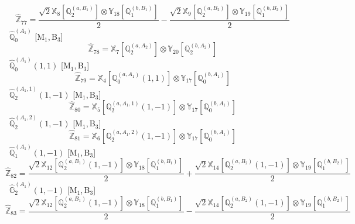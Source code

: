 \documentclass[fleqn,10pt,landscape]{article}
\begin{document}
\begin{itemize}
\begin{dmath*}
\hat{\mathbb{Z}}_{77}=\frac{\sqrt{2} \mathbb{X}_{8}[\mathbb{Q}_{2}^{(a,B_{1})}] \otimes\mathbb{Y}_{18}[\mathbb{Q}_{1}^{(b,B_{1})}]}{2} - \frac{\sqrt{2} \mathbb{X}_{9}[\mathbb{Q}_{2}^{(a,B_{2})}] \otimes\mathbb{Y}_{19}[\mathbb{Q}_{1}^{(b,B_{2})}]}{2}
\end{dmath*}
\vspace{4mm}
\noindent {} $\,\,\,\hat{\mathbb{Q}}_{0}^{(A_{1})}$ [M$_{1}$,\,B$_{3}$]
\begin{dmath*}
\hat{\mathbb{Z}}_{78}=\mathbb{X}_{7}[\mathbb{Q}_{2}^{(a,A_{2})}] \otimes\mathbb{Y}_{20}[\mathbb{Q}_{2}^{(b,A_{2})}]
\end{dmath*}
\vspace{4mm}
\noindent {} $\,\,\,\hat{\mathbb{Q}}_{0}^{(A_{1})}(1,1)$ [M$_{1}$,\,B$_{3}$]
\begin{dmath*}
\hat{\mathbb{Z}}_{79}=\mathbb{X}_{4}[\mathbb{Q}_{0}^{(a,A_{1})}(1,1)] \otimes\mathbb{Y}_{17}[\mathbb{Q}_{0}^{(b,A_{1})}]
\end{dmath*}
\vspace{4mm}
\noindent {} $\,\,\,\hat{\mathbb{Q}}_{2}^{(A_{1},1)}(1,-1)$ [M$_{1}$,\,B$_{3}$]
\begin{dmath*}
\hat{\mathbb{Z}}_{80}=\mathbb{X}_{5}[\mathbb{Q}_{2}^{(a,A_{1},1)}(1,-1)] \otimes\mathbb{Y}_{17}[\mathbb{Q}_{0}^{(b,A_{1})}]
\end{dmath*}
\vspace{4mm}
\noindent {} $\,\,\,\hat{\mathbb{Q}}_{2}^{(A_{1},2)}(1,-1)$ [M$_{1}$,\,B$_{3}$]
\begin{dmath*}
\hat{\mathbb{Z}}_{81}=\mathbb{X}_{6}[\mathbb{Q}_{2}^{(a,A_{1},2)}(1,-1)] \otimes\mathbb{Y}_{17}[\mathbb{Q}_{0}^{(b,A_{1})}]
\end{dmath*}
\vspace{4mm}
\noindent {} $\,\,\,\hat{\mathbb{Q}}_{1}^{(A_{1})}(1,-1)$ [M$_{1}$,\,B$_{3}$]
\begin{dmath*}
\hat{\mathbb{Z}}_{82}=\frac{\sqrt{2} \mathbb{X}_{12}[\mathbb{Q}_{2}^{(a,B_{1})}(1,-1)] \otimes\mathbb{Y}_{18}[\mathbb{Q}_{1}^{(b,B_{1})}]}{2} + \frac{\sqrt{2} \mathbb{X}_{14}[\mathbb{Q}_{2}^{(a,B_{2})}(1,-1)] \otimes\mathbb{Y}_{19}[\mathbb{Q}_{1}^{(b,B_{2})}]}{2}
\end{dmath*}
\vspace{4mm}
\noindent {} $\,\,\,\hat{\mathbb{G}}_{2}^{(A_{1})}(1,-1)$ [M$_{1}$,\,B$_{3}$]
\begin{dmath*}
\hat{\mathbb{Z}}_{83}=\frac{\sqrt{2} \mathbb{X}_{12}[\mathbb{Q}_{2}^{(a,B_{1})}(1,-1)] \otimes\mathbb{Y}_{18}[\mathbb{Q}_{1}^{(b,B_{1})}]}{2} - \frac{\sqrt{2} \mathbb{X}_{14}[\mathbb{Q}_{2}^{(a,B_{2})}(1,-1)] \otimes\mathbb{Y}_{19}[\mathbb{Q}_{1}^{(b,B_{2})}]}{2}

\end{dmath*}
\end{itemize}
\end{document}

